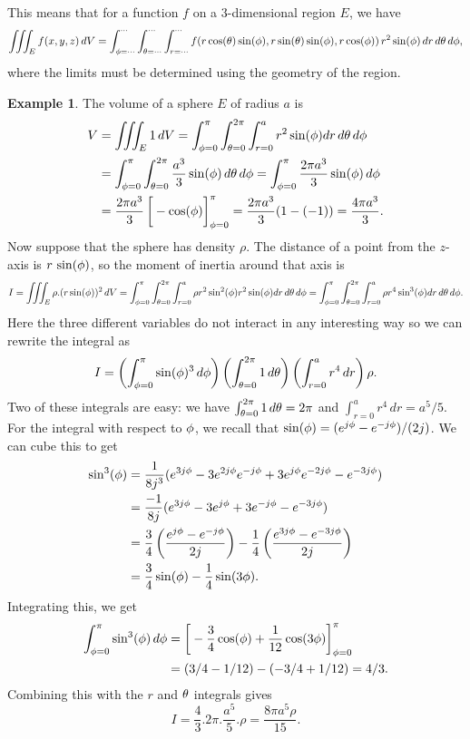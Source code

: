\documentclass[reqno]{amsart}
\theoremstyle{definition}
\newtheorem{example}[theorem]{Example}
\begin{document}
This means that for a function $f$ on a $3$-dimensional region $E$, we
have
\[ \iiint_E f(x,y,z)\,dV = 
    \int_{\phi=\dotsb}^{\dotsb}\int_{\theta=\dotsb}^{\dotsb}\int_{r=\dotsb}^{\dotsb}
     f(r\cos(\theta)\sin(\phi),r\sin(\theta)\sin(\phi),r\cos(\phi))
      \,r^2\sin(\phi)\,dr\,d\theta\,d\phi,
\]
where the limits must be determined using the geometry of the region.

\begin{example}\label{eg-sphere-volume}
 The volume of a sphere $E$ of radius $a$ is 
 \begin{align*}
  V &= \iiint_E 1\,dV 
     = \int_{\zen=0}^\pi \int_{\azi=0}^{2\pi} \int_{r=0}^a 
        r^2\sin(\zen) dr\,d\azi\,d\zen \\
    &= \int_{\zen=0}^\pi \int_{\azi=0}^{2\pi}
        \frac{a^3}{3} \sin(\zen)\,d\azi\,d\zen 
     = \int_{\zen=0}^\pi \frac{2\pi a^3}{3} \sin(\zen)\,d\zen \\
    &= \frac{2\pi a^3}{3} \CH{-\cos(\zen)}_{\zen=0}^\pi 
     = \frac{2\pi a^3}{3} (1-(-1)) = \frac{4\pi a^3}{3}.
 \end{align*}
 Now suppose that the sphere has density $\rho$.  The distance of a
 point from the $z$-axis is $r\,\sin(\phi)$, so the moment of inertia
 around that axis is 
 \[  I  = \iiint_E \rho.(r\sin(\phi))^2 \,dV 
        = \int_{\phi=0}^\pi \int_{\theta=0}^{2\pi} \int_{r=0}^a 
           \rho r^2\sin^2(\phi) r^2\sin(\phi) dr\,d\theta\,d\phi 
        = \int_{\phi=0}^\pi \int_{\theta=0}^{2\pi} \int_{r=0}^a 
           \rho r^4\sin^3(\phi) dr\,d\theta\,d\phi.
 \]
 Here the three different variables do not interact in any interesting
 way so we can rewrite the integral as
 \[ I = \left(\int_{\phi=0}^\pi\sin(\phi)^3\,d\phi\right) 
        \left(\int_{\theta=0}^{2\pi}1\,d\theta\right)
        \left(\int_{r=0}^a r^4\,dr\right)\rho.
 \]
 Two of these integrals are easy: we have
 $\int_{\theta=0}^{2\pi}1\,d\theta=2\pi$ and $\int_{r=0}^ar^4\,dr=a^5/5$.
 For the integral with respect to $\phi$, we recall that
 $\sin(\phi)=(e^{j\phi}-e^{-j\phi})/(2j)$.  We can cube this to get 
 \begin{align*}
  \sin^3(\phi) &= 
   \frac{1}{8j^3} (e^{3j\phi} - 3e^{2j\phi}e^{-j\phi}
                   + 3e^{j\phi}e^{-2j\phi} - e^{-3j\phi}) \\
   &= \frac{-1}{8j} (e^{3j\phi} - 3e^{j\phi}
                   + 3e^{-j\phi} - e^{-3j\phi}) \\
   &= \frac{3}{4}\left(\frac{e^{j\phi}-e^{-j\phi}}{2j}\right) 
       - \frac{1}{4}\left(\frac{e^{3j\phi}-e^{-3j\phi}}{2j}\right) \\
   &= \frac{3}{4}\sin(\phi) - \frac{1}{4}\sin(3\phi).  
 \end{align*}
 Integrating this, we get
 \begin{align*}
  \int_{\zen=0}^\pi \sin^3(\zen)\,d\zen &= 
   \CH{-\frac{3}{4}\cos(\zen)+\frac{1}{12}\cos(3\zen)}_{\zen=0}^\pi \\
   &= (3/4-1/12)-(-3/4+1/12) = 4/3.
 \end{align*}
 Combining this with the $r$ and $\theta$ integrals gives
 \[ I = \frac{4}{3} . 2\pi . \frac{a^5}{5}.\rho = \frac{8\pi a^5\rho}{15}. \]
\end{example}
\end{document}
